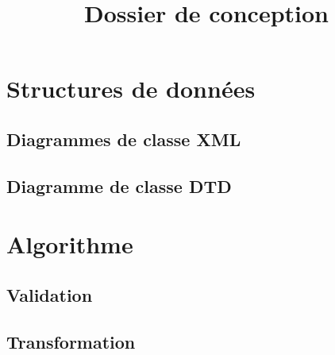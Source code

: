 

%

\title{Dossier de conception}


\maketitle
\tableofcontents

\newpage
\section{Structures de données}
\subsection{Diagrammes de classe XML}
\subsection{Diagramme de classe DTD}

\newpage
\section{Algorithme}
\subsection{Validation}
\subsection{Transformation}

%

